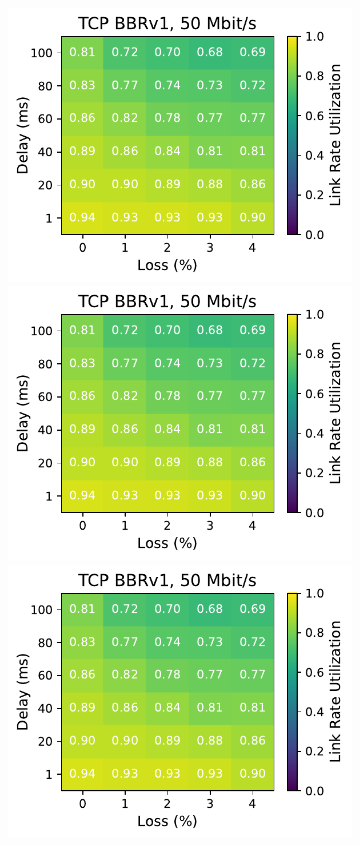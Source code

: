 \begin{figure}[ht]
\begin{subfigure}[b]{0.89cm}
        \includegraphics[width=\linewidth,trim={8cm 0 0 0},clip]{splitting/figures/heatmaps/heatmap_tcp_bbr1_50mbps.pdf}
        \includegraphics[width=\linewidth,trim={8cm 0 0 0},clip]{splitting/figures/heatmaps/heatmap_tcp_bbr1_50mbps.pdf}
        \includegraphics[width=\linewidth,trim={8cm 0 0 0},clip]{splitting/figures/heatmaps/heatmap_tcp_bbr1_50mbps.pdf}

\end{subfigure}
\end{figure}
